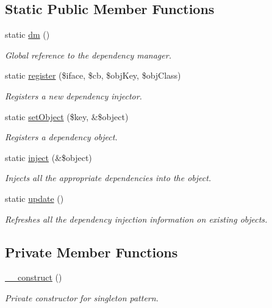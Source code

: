 \subsection*{Static Public Member Functions}
\begin{DoxyCompactItemize}
\item 
static \hyperlink{classDependencyManager_a9ad47b81726abff687bd46b2e183931b}{dm} ()
\begin{DoxyCompactList}\small\item\em Global reference to the dependency manager. \end{DoxyCompactList}\item 
static \hyperlink{classDependencyManager_a4c8a978f6db672cbfa1e371600dfac25}{register} (\$iface, \$cb, \$obj\-Key, \$obj\-Class)
\begin{DoxyCompactList}\small\item\em Registers a new dependency injector. \end{DoxyCompactList}\item 
static \hyperlink{classDependencyManager_a45e951902849e91e0c2f4be04fb29902}{set\-Object} (\$key, \&\$object)
\begin{DoxyCompactList}\small\item\em Registers a dependency object. \end{DoxyCompactList}\item 
static \hyperlink{classDependencyManager_a04d435fa48e2820fb665962463ba4edb}{inject} (\&\$object)
\begin{DoxyCompactList}\small\item\em Injects all the appropriate dependencies into the object. \end{DoxyCompactList}\item 
static \hyperlink{classDependencyManager_aac8afdb7452596f80b4f5b4210271a84}{update} ()
\begin{DoxyCompactList}\small\item\em Refreshes all the dependency injection information on existing objects. \end{DoxyCompactList}\end{DoxyCompactItemize}
\subsection*{Private Member Functions}
\begin{DoxyCompactItemize}
\item 
\hyperlink{classDependencyManager_a903c38b4ce12a2bca35fd64567ccbd66}{\-\_\-\-\_\-construct} ()
\begin{DoxyCompactList}\small\item\em Private constructor for singleton pattern. \end{DoxyCompactList}\end{DoxyCompactItemize}
